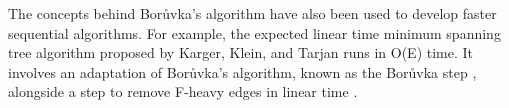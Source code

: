 \documentclass[a4paper, 11pt]{article}
\begin{document}
The concepts behind Borůvka's algorithm have also been used to develop faster sequential algorithms. For example, the expected linear time minimum spanning tree algorithm proposed by Karger, Klein, and Tarjan runs in O(E) time. It involves an adaptation of Borůvka's algorithm, known as the Borůvka step \cite{dixon1992verification, king1995simpler}, alongside a step to remove F-heavy edges in linear time \cite{karger1995randomized}.

\newpage


\end{document}
